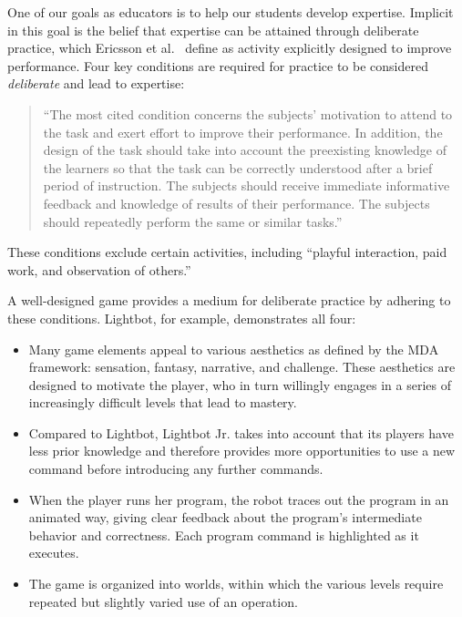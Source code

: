 \documentclass{sig-alternate-05-2015}
\begin{document}
One of our goals as educators is to help our students develop expertise. Implicit in this goal is the belief that expertise can be attained through deliberate practice, which Ericsson et al.~\cite{ericsson1993role} define as activity explicitly designed to improve performance. Four key conditions are required for practice to be considered {\em deliberate} and lead to expertise:\begin{quote}


``The most cited condition concerns the subjects' motivation to attend to the task and exert effort to improve their performance. In addition, the design of the task should take into account the preexisting knowledge of the learners so that the task can be correctly understood after a brief period of instruction. The subjects should receive immediate informative feedback and knowledge of results of their performance. The subjects should repeatedly perform the same or similar tasks.''\end{quote}


These conditions exclude certain activities, including ``playful interaction, paid work, and observation of others.''



A well-designed game provides a medium for deliberate practice by adhering to these conditions. Lightbot, for example, demonstrates all four:

\begin{itemize}
\item Many game elements appeal to various aesthetics as defined by the MDA framework: sensation, fantasy, narrative, and challenge. These aesthetics are designed to motivate the player, who in turn willingly engages in a series of increasingly difficult levels that lead to mastery.
\item Compared to Lightbot, Lightbot Jr. takes into account that its players have less prior knowledge and therefore provides more opportunities to use a new command before introducing any further commands.
\item When the player runs her program, the robot traces out the program in an animated way, giving clear feedback about the program's intermediate behavior and correctness. Each program command is highlighted as it executes.
\item The game is organized into worlds, within which the various levels require repeated but slightly varied use of an operation.
\end{itemize}
\end{document}
